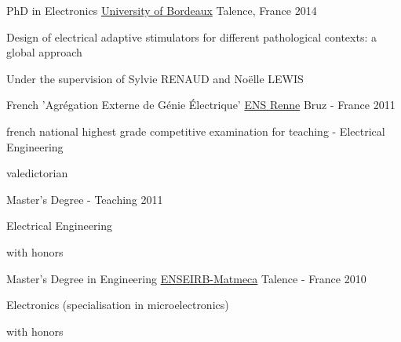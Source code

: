 

\begin{cventries}

  \cventry
    {PhD in Electronics} %
    {\href{https://ed-spi.u-bordeaux.fr}{University of Bordeaux}} %
    {Talence, France} %
    {2014} %
    {
      \begin{cvitems} %
        \item {Design of electrical adaptive stimulators for different pathological contexts: a global approach}
        \item {Under the supervision of Sylvie RENAUD and Noëlle LEWIS}
      \end{cvitems}
    }
    
  \cventry
    {French 'Agrégation Externe de Génie Électrique'} %
    {\href{https://www.ens-rennes.fr}{ENS Renne}} %
    {Bruz - France} %
    {2011} %
    {
      \begin{cvitems} %
        \item {french national highest grade competitive examination for teaching - Electrical Engineering}
        \item {valedictorian} 
      \end{cvitems}
    }
    
  \cventry
    {Master's Degree - Teaching} %
    {} %
    {} %
    {2011} %
    {
      \begin{cvitems} %
        \item {Electrical Engineering}
        \item {with honors}
      \end{cvitems}
    }
    
  \cventry
    {Master's Degree in Engineering} %
    {\href{https://enseirb-matmeca.bordeaux-inp.fr/en}{ENSEIRB-Matmeca}} %
    {Talence - France} %
    {2010} %
    {
      \begin{cvitems} %
        \item {Electronics (specialisation in microelectronics)}
        \item {with honors}
      \end{cvitems}
    }
   

\end{cventries}
